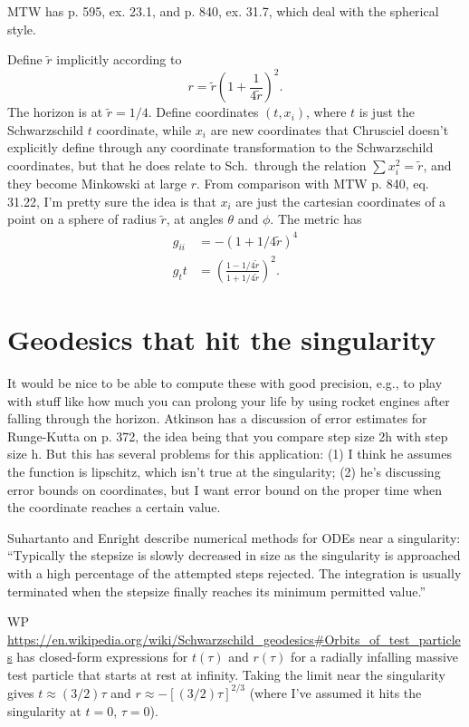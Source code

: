 \documentclass{article}
\begin{document}
MTW has p. 595, ex. 23.1, and p. 840, ex. 31.7, which deal with the spherical style.

Define $\tilde{r}$ implicitly according to
\begin{equation}
  r = \tilde{r}\left(1+\frac{1}{4\tilde{r}}\right)^2.
\end{equation}
The horizon is at $\tilde{r}=1/4$. Define coordinates $(t,x_i)$, where $t$ is
just the Schwarzschild $t$ coordinate, while $x_i$ are new coordinates that Chrusciel doesn't
explicitly define through any coordinate transformation to the Schwarzschild coordinates,
but that he does relate to Sch.~through the relation $\sum x_i^2=\tilde{r}$, and they
become Minkowski at large $r$. From comparison with MTW p. 840, eq. 31.22, I'm pretty
sure the idea is that $x_i$ are just the cartesian coordinates of a point on a sphere
of radius $\tilde{r}$, at angles $\theta$ and $\phi$. The metric has
\begin{align}
  g_{ii} &= -(1+1/4\tilde{r})^4 \\
  g_tt &= \left(\frac{1-1/4\tilde{r}}{1+1/4\tilde{r}}\right)^2.
\end{align}

\section{Geodesics that hit the singularity}

It would be nice to be able to compute these with good precision, e.g., to play with
stuff like how much you can prolong your life by using rocket engines after falling
through the horizon. Atkinson has a discussion of error estimates for Runge-Kutta on
p. 372, the idea being that you compare step size 2h with step size h. But this has
several problems for this application: (1) I think he assumes the function is lipschitz,
which isn't true at the singularity; (2) he's discussing error bounds on coordinates,
but I want error bound on the proper time when the coordinate reaches a certain value.

Suhartanto and Enright describe numerical methods for ODEs near a singularity:
``Typically
the stepsize is slowly decreased in size as the singularity is
approached with a high percentage of the attempted steps rejected.
The integration is usually terminated when the stepsize finally
reaches its minimum permitted value.''

WP
\url{https://en.wikipedia.org/wiki/Schwarzschild_geodesics#Orbits_of_test_particles}
has closed-form expressions for $t(\tau)$ and $r(\tau)$ for a radially infalling
massive test particle that starts at rest at infinity. Taking the limit near the singularity gives
$t\approx(3/2)\tau$ and $r\approx -[(3/2)\tau]^{2/3}$ (where I've assumed it hits
the singularity at $t=0$, $\tau=0$).
\end{document}

